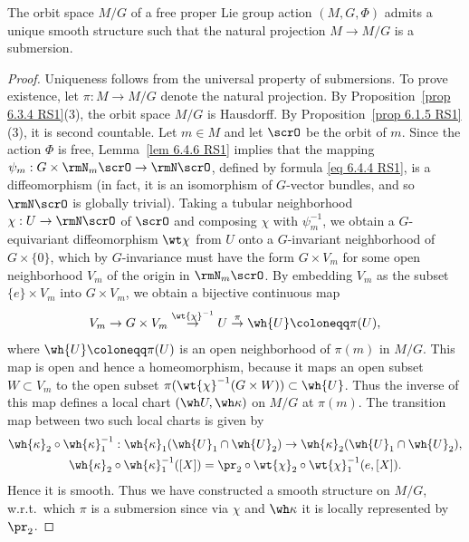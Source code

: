 \begin{cor}[{{\cite[Cor.~6.5.1]{RS1}}}]\label{cor 6.5.1 RS1}
    The orbit space $M\slash G$ of a free proper Lie group action $(M,G,\Phi)$ admits a unique smooth structure such that the natural projection $M\to M\slash G$ is a submersion.
\end{cor}
\begin{proof}
    Uniqueness follows from the universal property of submersions. To prove existence, let $\pi:M\to M\slash G$ denote the natural projection. By Proposition~\ref{prop 6.3.4 RS1}(3), the orbit space $M\slash G$ is Hausdorff. By Proposition~\ref{prop 6.1.5 RS1}(3), it is second countable. Let $m\in M$ and let $\scrO$ be the orbit of $m$. Since the action $\Phi$ is free, Lemma~\ref{lem 6.4.6 RS1} implies that the mapping $\psi_m:G\times \rmN_m \scrO\to \rmN \scrO$, defined by formula \eqref{eq 6.4.4 RS1}, is a diffeomorphism (in fact, it is an isomorphism of $G$-vector bundles, and so $\rmN \scrO$ is globally trivial). Taking a tubular neighborhood $\chi:U\to \rmN \scrO$ of $\scrO$ and composing $\chi$ with $\psi_m^{-1}$, we obtain a $G$-equivariant diffeomorphism $\wt\chi$ from $U$ onto a $G$-invariant neighborhood of $G\times\{0\}$, which by $G$-invariance must have the form $G\times V_m$ for some open neighborhood $V_m$ of the origin in $\rmN_m\scrO$. By embedding $V_m$ as the subset $\{e\}\times V_m$ into $G\times V_m$, we obtain a bijective continuous map
    \[V_m\to G\times V_m\overset{\wt{\chi}^{-1}}{\to}U\overset{\pi}{\to}\wh{U}\coloneqq \pi(U),\]
    where $\wh{U}\coloneqq \pi(U)$ is an open neighborhood of $\pi(m)$ in $M\slash G$. This map is open and hence a homeomorphism, because it maps an open subset $W\subset V_m$ to the open subset $\pi(\wt{\chi}^{-1}(G\times W))\subset \wh{U}$. Thus the inverse of this map defines a local chart $(\wh U,\wh \kappa)$ on $M\slash G$ at $\pi(m)$. The transition map between two such local charts is given by
    \begin{gather}
        \wh{\kappa}_2\circ\wh{\kappa}_1^{-1}:\wh{\kappa}_1(\wh{U}_1\cap \wh{U}_2)\to \wh{\kappa}_2(\wh{U}_1\cap \wh{U}_2),\\
        \wh{\kappa}_2\circ\wh{\kappa}_1^{-1}([X])=\pr_2\circ\wt{\chi}_2\circ\wt{\chi}_1^{-1}(e,[X]).
    \end{gather}
    Hence it is smooth. Thus we have constructed a smooth structure on $M\slash G$, w.r.t.\ which $\pi$ is a submersion since via $\chi$ and $\wh\kappa$ it is locally represented by $\pr_2$.
\end{proof}

